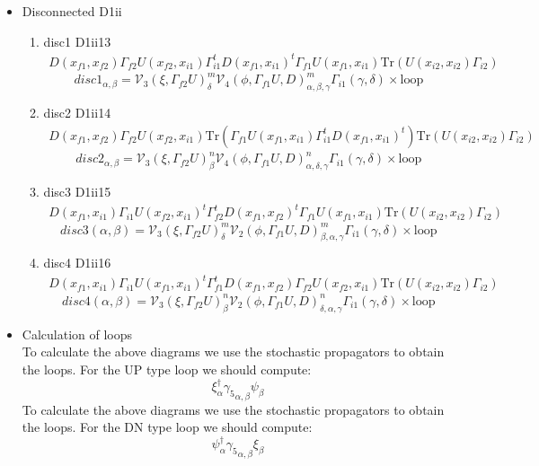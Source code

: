 \documentclass{article}[12pt]
\begin{document}
\begin{itemize}
\begin{enumerate}
\end{enumerate}
\item Disconnected D1ii
\begin{enumerate}
\item disc1 D1ii13
\begin{eqnarray}
D(x_{f1},x_{f2})\Gamma_{f2}U(x_{f2},x_{i1})\Gamma_{i1}^tD\left(x_{f1},x_{i1}\right)^t\Gamma_{f1}U\left(x_{f1},x_{i1}\right)\mathrm{Tr}\left(U\left(x_{i2},x_{i2}\right)\Gamma_{i2}\right)
\end{eqnarray}
$$
disc1_{\alpha,\beta}={\mathcal V}_{3}\left(\xi,\Gamma_{f2}U\right)_{\delta}^{m}{\mathcal V}_4\left(\phi,\Gamma_{f1}U,D\right)_{\alpha,\beta,\gamma}^m\Gamma_{i1}\left(\gamma,\delta\right)\times \mathrm{loop}
$$
\item disc2 D1ii14
\begin{eqnarray}
D(x_{f1},x_{f2})\Gamma_{f2}U(x_{f2},x_{i1})\mathrm{Tr}\left(\Gamma_{f1}U\left(x_{f1},x_{i1}\right)\Gamma_{i1}^tD\left(x_{f1},x_{i1}\right)^t\right)\mathrm{Tr}\left(U\left(x_{i2},x_{i2}\right)\Gamma_{i2}\right)\
\end{eqnarray}
$$
disc2_{\alpha,\beta}={\mathcal V}_{3}\left(\xi,\Gamma_{f2}U\right)_{\beta}^{n}{\mathcal V}_4\left(\phi,\Gamma_{f1}U,D\right)_{\alpha,\delta,\gamma}^n\Gamma_{i1}\left(\gamma,\delta\right)\times \mathrm{loop}
$$
\item disc3 D1ii15
\begin{eqnarray}
D(x_{f1},x_{i1})\Gamma_{i1}U(x_{f2},x_{i1})^t\Gamma_{f2}^tD\left(x_{f1},x_{f2}\right)^t\Gamma_{f1}U\left(x_{f1},x_{i1}\right)\mathrm{Tr}\left(U\left(x_{i2},x_{i2}\right)\Gamma_{i2}\right)
\end{eqnarray}
$$
disc3\left(\alpha,\beta\right)={\mathcal V}_{3}\left(\xi,\Gamma_{f2}U\right)_{\delta}^{m}{\mathcal V}_2\left(\phi,\Gamma_{f1}U,D\right)_{\beta,\alpha,\gamma}^m\Gamma_{i1}\left(\gamma,\delta\right)\times \mathrm{loop}
$$
\item disc4 D1ii16
\begin{eqnarray}
D(x_{f1},x_{i1})\Gamma_{i1}U(x_{f1},x_{i1})^t\Gamma_{f1}^tD\left(x_{f1},x_{f2}\right)\Gamma_{f2}U\left(x_{f2},x_{i1}\right)\mathrm{Tr}\left(U\left(x_{i2},x_{i2}\right)\Gamma_{i2}\right)
\end{eqnarray}
$$
disc4\left(\alpha,\beta\right)={\mathcal V}_{3}\left(\xi,\Gamma_{f2}U\right)_{\beta}^{n}{\mathcal V}_2\left(\phi,\Gamma_{f1}U,D\right)_{\delta,\alpha,\gamma}^n\Gamma_{i1}\left(\gamma,\delta\right)\times \mathrm{loop}
$$
\end{enumerate}
\item Calculation of loops \\
To calculate the above diagrams we use the stochastic propagators to obtain the loops.
For the UP type loop we should compute:
$$
\xi^{\dagger}_{\alpha}{\gamma_5}_{\alpha,\beta}\psi_{\beta}
$$
To calculate the above diagrams we use the stochastic propagators to obtain the loops.
For the DN type loop we should compute:
$$
\psi^{\dagger}_{\alpha}{\gamma_5}_{\alpha,\beta}\xi_{\beta}
$$
\end{itemize}
\end{document}

